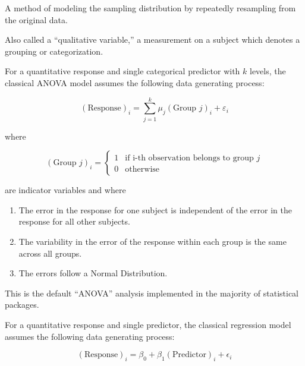 \documentclass[
  letterpaper,
  DIV=11,
  numbers=noendperiod]{scrreprt}
\providecommand{\tightlist}{%
  \setlength{\itemsep}{0pt}\setlength{\parskip}{0pt}}\usepackage{longtable,booktabs,array}
\theoremstyle{plain}
\theoremstyle{definition}
\theoremstyle{definition}
\theoremstyle{remark}
\begin{document}
\begin{description}
\tightlist
\item[Bootstrapping (Definition~\ref{def-bootstrap})]
A method of modeling the sampling distribution by repeatedly resampling
from the original data.
\item[Categorical Variable (Definition~\ref{def-categorical})]
Also called a ``qualitative variable,'' a measurement on a subject which
denotes a grouping or categorization.
\item[Classical ANOVA Model (Definition~\ref{def-classical-anova})]
For a quantitative response and single categorical predictor with \(k\)
levels, the classical ANOVA model assumes the following data generating
process:
\end{description}

\[(\text{Response})_i = \sum_{j=1}^{k} \mu_j (\text{Group } j)_i + \varepsilon_i\]

where

\[
(\text{Group } j)_{i} = \begin{cases}
  1 & \text{if i-th observation belongs to group } j \\
  0 & \text{otherwise}
  \end{cases}
\]

are indicator variables and where

\begin{enumerate}
\def\labelenumi{\arabic{enumi}.}
\tightlist
\item
  The error in the response for one subject is independent of the error
  in the response for all other subjects.
\item
  The variability in the error of the response within each group is the
  same across all groups.
\item
  The errors follow a Normal Distribution.
\end{enumerate}

This is the default ``ANOVA'' analysis implemented in the majority of
statistical packages.

\begin{description}
\tightlist
\item[Classical Regression Model
(Definition~\ref{def-classical-regression})]
For a quantitative response and single predictor, the classical
regression model assumes the following data generating process:
\end{description}

\[(\text{Response})_i = \beta_0 + \beta_1 (\text{Predictor})_{i} + \epsilon_i\]
\end{document}
